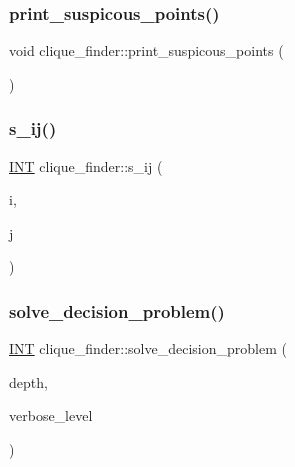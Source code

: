 \mbox{\label{classclique__finder_a7a507dcd67a47eb5116df7138a838820}} 
\subsubsection{\texorpdfstring{print\+\_\+suspicous\+\_\+points()}{print\_suspicous\_points()}}
{\footnotesize\ttfamily void clique\+\_\+finder\+::print\+\_\+suspicous\+\_\+points (\begin{DoxyParamCaption}{ }\end{DoxyParamCaption})}

\mbox{\label{classclique__finder_acf6a483e2606040f80042b9de80e4b7b}} 
\subsubsection{\texorpdfstring{s\+\_\+ij()}{s\_ij()}}
{\footnotesize\ttfamily \mbox{\hyperlink{galois_8h_a09fddde158a3a20bd2dcadb609de11dc}{I\+NT}} clique\+\_\+finder\+::s\+\_\+ij (\begin{DoxyParamCaption}\item[{\mbox{\hyperlink{galois_8h_a09fddde158a3a20bd2dcadb609de11dc}{I\+NT}}}]{i,  }\item[{\mbox{\hyperlink{galois_8h_a09fddde158a3a20bd2dcadb609de11dc}{I\+NT}}}]{j }\end{DoxyParamCaption})}

\mbox{\label{classclique__finder_a56caf53f860dbbc0b13448b5982773e2}} 
\subsubsection{\texorpdfstring{solve\+\_\+decision\+\_\+problem()}{solve\_decision\_problem()}}
{\footnotesize\ttfamily \mbox{\hyperlink{galois_8h_a09fddde158a3a20bd2dcadb609de11dc}{I\+NT}} clique\+\_\+finder\+::solve\+\_\+decision\+\_\+problem (\begin{DoxyParamCaption}\item[{\mbox{\hyperlink{galois_8h_a09fddde158a3a20bd2dcadb609de11dc}{I\+NT}}}]{depth,  }\item[{\mbox{\hyperlink{galois_8h_a09fddde158a3a20bd2dcadb609de11dc}{I\+NT}}}]{verbose\+\_\+level }\end{DoxyParamCaption})}

